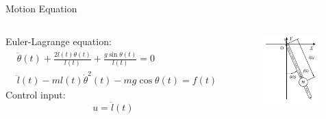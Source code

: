 \documentclass[10pt]{beamer}
\begin{document}
  \begin{frame}{Motion Equation}
    \begin{columns}[c,onlytextwidth]
        Euler-Lagrange equation:
        \begin{align*}
          &\ddot{\theta}(t)+\frac{2\dot{l}(t)\dot{\theta}(t)}{l(t)}+
            \frac{g\sin\theta(t)}{l(t)} = 0  \\
          &\ddot{l}(t)-ml(t)\dot{\theta}^2(t)-mg\cos\theta(t) = f(t)
        \end{align*}
        Control input:
        \begin{equation*}
          u = \ddot{l}(t)
        \end{equation*}
        \begin{figure}
          \includegraphics[width=0.96\textwidth,right]{images/vlp.png}
        \end{figure}
    \end{columns}
  \end{frame}
\end{document}
